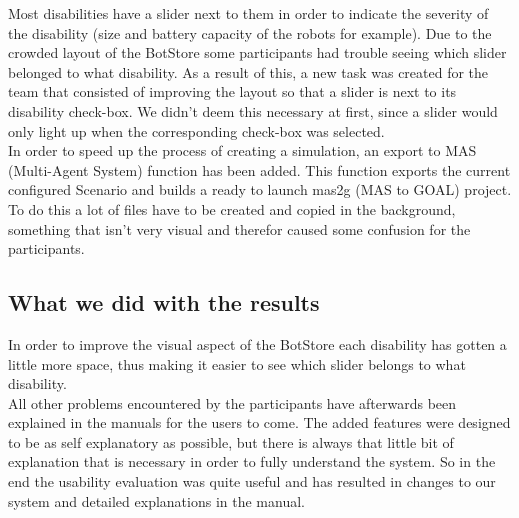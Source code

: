 Most disabilities have a slider next to them in order to indicate the severity of the disability (size and battery capacity of the robots for example). Due to the crowded layout of the BotStore some participants had trouble seeing which slider belonged to what disability. As a result of this, a new task was created for the team that consisted of improving the layout so that a slider is next to its disability check-box. We didn't deem this necessary at first, since a slider would only light up when the corresponding check-box was selected.\\
In order to speed up the process of creating a simulation, an export to MAS (Multi-Agent System) function has been added. This function exports the current configured Scenario and builds a ready to launch mas2g (MAS to GOAL) project. To do this a lot of files have to be created and copied in the background, something that isn't very visual and therefor caused some confusion for the participants.

\subsection*{What we did with the results}
In order to improve the visual aspect of the BotStore each disability has gotten a little more space, thus making it easier to see which slider belongs to what disability. \\
All other problems encountered by the participants have afterwards been explained in the manuals for the users to come. The added features were designed to be as self explanatory as possible, but there is always that little bit of explanation that is necessary in order to fully understand the system. So in the end the usability evaluation was quite useful and has resulted in changes to our system and detailed explanations in the manual.
